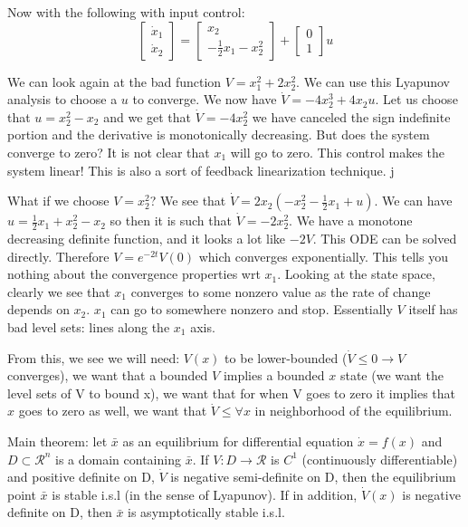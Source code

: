 \documentclass[11pt]{article}
\begin{document}
Now with the following with input control: 
\begin{equation}
\begin{bmatrix}
\dot{x}_1 \\
\dot{x}_2
\end{bmatrix} =
\begin{bmatrix}
x_2 \\
-\frac{1}{2}x_1 - x_2^2 
\end{bmatrix} + 
\begin{bmatrix}
0 \\
1
\end{bmatrix}u
\end{equation}

We can look again at the bad function $V = x_1^2 + 2x_2^2$. We can use this Lyapunov analysis to choose a $u$ to converge. We now have $\dot{V} = -4x_2^3 + 4x_2u$. Let us choose that $u = x_2^2 -x_2$ and we get that $\dot{V} = -4x_2^2$ we have canceled the sign indefinite portion and the derivative is monotonically decreasing.  But does the system converge to zero? It is not clear that $x_1$ will go to zero. This control makes the system linear! This is also a sort of feedback linearization technique. j

What if we choose $V = x_2^2$? We see that $\dot{V} = 2x_2(-x_2^2 -\frac{1}{2}x_1 + u)$. We can have $u = \frac{1}{2}x_1 + x_2^2 -x_2$ so then it is such that $\dot{V} = -2x_2^2$. We have a monotone decreasing definite function, and it looks a lot like $-2V$. This ODE can be solved directly. Therefore $V = e^{-2t}V(0)$ which converges exponentially. This tells you nothing about the convergence properties wrt $x_1$. Looking at the state space, clearly we see that $x_1$ converges to some nonzero value as the rate of change depends on $x_2$. $x_1$ can go to somewhere nonzero and stop. Essentially $V$ itself has bad level sets: lines along the $x_1$ axis. 

From this, we see we will need: $V(x)$ to be lower-bounded ($\dot{V}\leq 0 \rightarrow V$ converges), we want that a bounded $V$ implies a bounded $x$ state (we want the level sets of V to bound x), we want that for when V goes to zero it implies that $x$ goes to zero as well, we want that $\dot{V}\leq \forall x$ in neighborhood of the equilibrium. 

Main theorem: let $\bar{x}$ as an equilibrium for differential equation $\dot{x} = f(x)$ and $D \subset \mathcal{R}^n$ is a domain containing $\bar{x}$. If $V:D\rightarrow \mathcal{R}$ is $C^1$ (continuously differentiable) and positive definite on D, $\dot{V}$ is negative semi-definite on D, then the equilibrium point $\bar{x}$ is stable i.s.l (in the sense of Lyapunov). If in addition, $\dot{V}(x)$ is negative definite on D, then $\bar{x}$ is asymptotically stable i.s.l.
\end{document}
